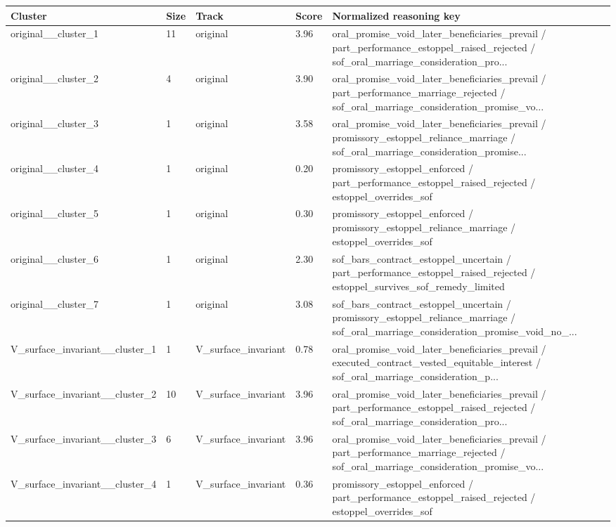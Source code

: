 \begin{tabular}{lllll}
\toprule
Cluster & Size & Track & Score & Normalized reasoning key \\
\midrule
original\_\_cluster\_1 & 11 & original & 3.96 & oral\_promise\_void\_later\_beneficiaries\_prevail / part\_performance\_estoppel\_raised\_rejected / sof\_oral\_marriage\_consideration\_pro... \\
original\_\_cluster\_2 & 4 & original & 3.90 & oral\_promise\_void\_later\_beneficiaries\_prevail / part\_performance\_marriage\_rejected / sof\_oral\_marriage\_consideration\_promise\_vo... \\
original\_\_cluster\_3 & 1 & original & 3.58 & oral\_promise\_void\_later\_beneficiaries\_prevail / promissory\_estoppel\_reliance\_marriage / sof\_oral\_marriage\_consideration\_promise... \\
original\_\_cluster\_4 & 1 & original & 0.20 & promissory\_estoppel\_enforced / part\_performance\_estoppel\_raised\_rejected / estoppel\_overrides\_sof \\
original\_\_cluster\_5 & 1 & original & 0.30 & promissory\_estoppel\_enforced / promissory\_estoppel\_reliance\_marriage / estoppel\_overrides\_sof \\
original\_\_cluster\_6 & 1 & original & 2.30 & sof\_bars\_contract\_estoppel\_uncertain / part\_performance\_estoppel\_raised\_rejected / estoppel\_survives\_sof\_remedy\_limited \\
original\_\_cluster\_7 & 1 & original & 3.08 & sof\_bars\_contract\_estoppel\_uncertain / promissory\_estoppel\_reliance\_marriage / sof\_oral\_marriage\_consideration\_promise\_void\_no\_... \\
V\_surface\_invariant\_\_cluster\_1 & 1 & V\_surface\_invariant & 0.78 & oral\_promise\_void\_later\_beneficiaries\_prevail / executed\_contract\_vested\_equitable\_interest / sof\_oral\_marriage\_consideration\_p... \\
V\_surface\_invariant\_\_cluster\_2 & 10 & V\_surface\_invariant & 3.96 & oral\_promise\_void\_later\_beneficiaries\_prevail / part\_performance\_estoppel\_raised\_rejected / sof\_oral\_marriage\_consideration\_pro... \\
V\_surface\_invariant\_\_cluster\_3 & 6 & V\_surface\_invariant & 3.96 & oral\_promise\_void\_later\_beneficiaries\_prevail / part\_performance\_marriage\_rejected / sof\_oral\_marriage\_consideration\_promise\_vo... \\
V\_surface\_invariant\_\_cluster\_4 & 1 & V\_surface\_invariant & 0.36 & promissory\_estoppel\_enforced / part\_performance\_estoppel\_raised\_rejected / estoppel\_overrides\_sof \\

\end{tabular}
